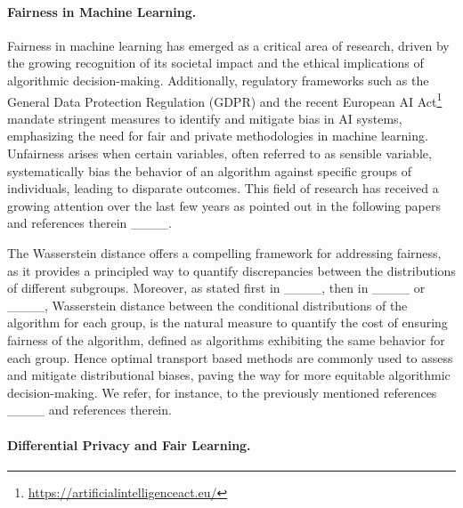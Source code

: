 \paragraph{Fairness in Machine Learning.}
Fairness in machine learning has emerged as a critical area of research, driven  by the growing recognition of its societal impact and the ethical implications of algorithmic decision-making. Additionally, regulatory frameworks such as the General Data Protection Regulation (GDPR) and the recent European AI Act\footnote{\url{https://artificialintelligenceact.eu/}} mandate stringent measures to identify and mitigate bias in AI systems, emphasizing the need for fair and private methodologies in machine learning. Unfairness arises when certain variables, often referred to as sensible variable, systematically bias the behavior of an algorithm against specific groups of individuals, leading to disparate outcomes. This field of research has received a growing attention over the last few years as pointed out in the following papers and references therein ____.

The Wasserstein distance offers a compelling framework for addressing fairness, as it provides a principled way to quantify discrepancies between the distributions of different subgroups. Moreover, as stated first in ____, then in ____ or ____, Wasserstein distance between the conditional distributions of the algorithm  for each group, is the natural  measure to quantify the cost of ensuring fairness of the algorithm, defined as algorithms exhibiting the same behavior for each group. Hence optimal transport based methods are commonly used to  assess and mitigate distributional biases, paving the way for more equitable algorithmic decision-making. We refer, for instance, to the previously mentioned references ____ and references therein.


\paragraph{Differential Privacy and Fair Learning.}

